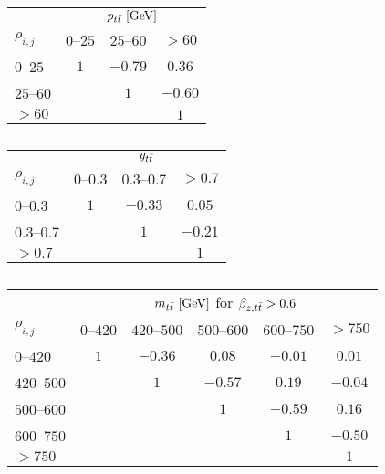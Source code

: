 
\begin{table}[!htp]\centering
\caption{ }
\begin{tabular}{l c c c }
  \toprule
  &\multicolumn{3}{c}{$p_{t\bar{t}}{}~[\rm{GeV}]$}    \\
  $\rho_{i,j}$      &     $0$--$25$           &        $25$--$60$         &  $>60$            \\
  \midrule
  $0$--$25$       &    $1$    &    $-0.79$  &   $0.36$  \\
  $25$--$60$      &           &    $1$      &   $-0.60$ \\
  $>60$           &           &             &   $1$     \\
  \bottomrule
\end{tabular}
\label{tab:corr_pttt}
\end{table}

\begin{table}[!htp]\centering
\caption{ }
\begin{tabular}{l c c c }
  \toprule
  &\multicolumn{3}{c}{$y_{t\bar{t}}{}$}    \\
  $\rho_{i,j}$      &  $0$--$0.3$   &  $0.3$--$0.7$  &  $>0.7$  \\
  \midrule
  $0$--$0.3$    &   $1$   &   $-0.33$  &   $0.05$   \\
  $0.3$--$0.7$  &         &   $1$      &   $-0.21$  \\
  $>0.7$        &         &            &   $1$      \\
  \bottomrule
\end{tabular}
\label{tab:corr_ytt}
\end{table}

\begin{table}[!htp]\centering
\caption{ }
\begin{tabular}{l c c c c c }
  \toprule
  &\multicolumn{5}{c}{$m_{t\bar{t}}{}~[\rm{GeV}]$ for $\beta_{z,t\bar{t}}{}> 0.6$}    \\
  $\rho_{i,j}$ & $0$--$420$ & $420$--$500$ & $500$--$600$ & $600$--$750$ & $>750$ \\
  \midrule
  $0$--$420$      & $1$ & $-0.36$ & $0.08$  & $-0.01$ & $0.01$  \\
  $420$--$500$    &     & $1$     & $-0.57$ & $0.19$  & $-0.04$ \\
  $500$--$600$    &     &         & $1$     & $-0.59$ & $0.16$  \\
  $600$--$750$    &     &         &         & $1$     & $-0.50$ \\
  $>750$          &     &         &         &         & $1$     \\
  \bottomrule
\end{tabular}
\label{tab:corr_mtt_beta}
\end{table}
